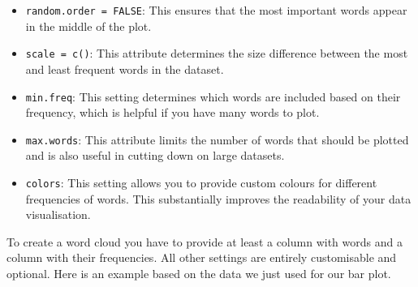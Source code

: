 \documentclass[
  letterpaper,
  DIV=11,
  numbers=noendperiod]{scrreprt}
\newenvironment{Shaded}{\begin{snugshade}}{\end{snugshade}}
\newcommand{\AttributeTok}[1]{\textcolor[rgb]{0.40,0.45,0.13}{#1}}
\newcommand{\CommentTok}[1]{\textcolor[rgb]{0.37,0.37,0.37}{#1}}
\newcommand{\ConstantTok}[1]{\textcolor[rgb]{0.56,0.35,0.01}{#1}}
\newcommand{\DecValTok}[1]{\textcolor[rgb]{0.68,0.00,0.00}{#1}}
\newcommand{\FloatTok}[1]{\textcolor[rgb]{0.68,0.00,0.00}{#1}}
\newcommand{\FunctionTok}[1]{\textcolor[rgb]{0.28,0.35,0.67}{#1}}
\newcommand{\NormalTok}[1]{\textcolor[rgb]{0.00,0.23,0.31}{#1}}
\newcommand{\OtherTok}[1]{\textcolor[rgb]{0.00,0.23,0.31}{#1}}
\newcommand{\SpecialCharTok}[1]{\textcolor[rgb]{0.37,0.37,0.37}{#1}}
\newcommand{\StringTok}[1]{\textcolor[rgb]{0.13,0.47,0.30}{#1}}
\begin{document}
\begin{itemize}
\item
  \texttt{random.order\ =\ FALSE}: This ensures that the most important
  words appear in the middle of the plot.
\item
  \texttt{scale\ =\ c()}: This attribute determines the size difference
  between the most and least frequent words in the dataset.
\item
  \texttt{min.freq}: This setting determines which words are included
  based on their frequency, which is helpful if you have many words to
  plot.
\item
  \texttt{max.words}: This attribute limits the number of words that
  should be plotted and is also useful in cutting down on large
  datasets.
\item
  \texttt{colors}: This setting allows you to provide custom colours for
  different frequencies of words. This substantially improves the
  readability of your data visualisation.
\end{itemize}

To create a word cloud you have to provide at least a column with words
and a column with their frequencies. All other settings are entirely
customisable and optional. Here is an example based on the data we just
used for our bar plot.

\begin{Shaded}
\end{Shaded}
\end{document}
